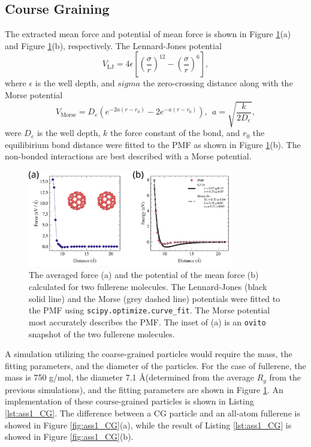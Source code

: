 \documentclass[10pt,a4paper]{labreport}
\begin{document}
\subsection{Course Graining}
The extracted mean force and potential of mean force is shown in Figure \ref{fig:ass1_force-and-PMF}(a) and Figure \ref{fig:ass1_force-and-PMF}(b), respectively. 
The Lennard-Jones potential
\begin{equation}
  V_\text{LJ} = 4 \epsilon \left[ \left(\frac{\sigma}{r}\right)^{12} - \left(\frac{\sigma}{r}\right)^{6}\right],
\end{equation}
where $\epsilon$ is the well depth, and $sigma$ the zero-crossing distance
along with the Morse potential
\begin{equation}
  V_\text{Morse} = D_e\left( e ^{-2 a (r- r_0)} - 2 e^{-a(r-r_0)}\right),~~ a = \sqrt{\frac{k}{2D_e}},
\end{equation}
were $D_e$ is the well depth, $k$ the force constant of the bond, and $r_0$ the equilibirium bond distance were fitted to the PMF as shown in Figure \ref{fig:ass1_force-and-PMF}(b). The non-bonded interactions are best described with a Morse potential. 
\begin{figure}[h!]
  \centering
  \includegraphics[width = 0.8\textwidth]{figs/ass1.png}
  \caption{The averaged force (a) and the potential of the mean force (b) calculated for two fullerene molecules. The Lennard-Jones (black solid line) and the Morse (grey dashed line) potentials were fitted to the PMF using \texttt{scipy.optimize.curve\_fit}. The Morse potential most accurately describes the PMF. The inset of (a) is an \texttt{ovito} snapshot of the two fullerene molecules.}
  \label{fig:ass1_force-and-PMF}
\end{figure}

A simulation utilizing the coarse-grained particles would require the mass, the fitting parameters, and the diameter of the particles. 
For the case of fullerene, the mass is 750 g/mol, the diameter 7.1 \AA (determined from the average $R_g$ from the previous simulations), and the fitting parameters are shown in Figure \ref{fig:ass1_force-and-PMF}. 
An implementation of these course-grained particles is shown in Listing \ref{lst:ass1_CG}.
The difference between a CG particle and an all-atom fullerene is showed in Figure \ref{fig:ass1_CG}(a), while the result of Listing \ref{lst:ass1_CG} is showed in Figure \ref{fig:ass1_CG}(b).  
\end{document}
